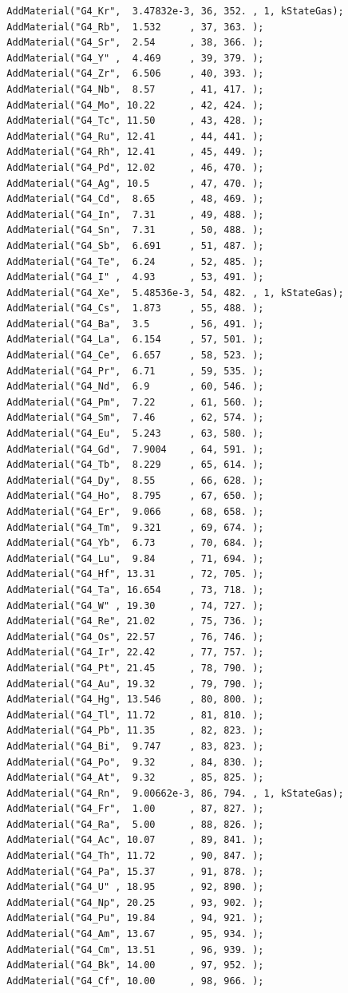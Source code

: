 \documentclass[a4paper,12pt]{article}
\begin{document}
\begin{verbatim}
  AddMaterial("G4_Kr",  3.47832e-3, 36, 352. , 1, kStateGas);
  AddMaterial("G4_Rb",  1.532     , 37, 363. );
  AddMaterial("G4_Sr",  2.54      , 38, 366. );
  AddMaterial("G4_Y" ,  4.469     , 39, 379. );
  AddMaterial("G4_Zr",  6.506     , 40, 393. );
  AddMaterial("G4_Nb",  8.57      , 41, 417. );
  AddMaterial("G4_Mo", 10.22      , 42, 424. );
  AddMaterial("G4_Tc", 11.50      , 43, 428. );
  AddMaterial("G4_Ru", 12.41      , 44, 441. );
  AddMaterial("G4_Rh", 12.41      , 45, 449. );
  AddMaterial("G4_Pd", 12.02      , 46, 470. );
  AddMaterial("G4_Ag", 10.5       , 47, 470. );
  AddMaterial("G4_Cd",  8.65      , 48, 469. );
  AddMaterial("G4_In",  7.31      , 49, 488. );
  AddMaterial("G4_Sn",  7.31      , 50, 488. );
  AddMaterial("G4_Sb",  6.691     , 51, 487. );
  AddMaterial("G4_Te",  6.24      , 52, 485. );
  AddMaterial("G4_I" ,  4.93      , 53, 491. );
  AddMaterial("G4_Xe",  5.48536e-3, 54, 482. , 1, kStateGas);
  AddMaterial("G4_Cs",  1.873     , 55, 488. );
  AddMaterial("G4_Ba",  3.5       , 56, 491. );
  AddMaterial("G4_La",  6.154     , 57, 501. );
  AddMaterial("G4_Ce",  6.657     , 58, 523. );
  AddMaterial("G4_Pr",  6.71      , 59, 535. );
  AddMaterial("G4_Nd",  6.9       , 60, 546. );
  AddMaterial("G4_Pm",  7.22      , 61, 560. );
  AddMaterial("G4_Sm",  7.46      , 62, 574. );
  AddMaterial("G4_Eu",  5.243     , 63, 580. );
  AddMaterial("G4_Gd",  7.9004    , 64, 591. );
  AddMaterial("G4_Tb",  8.229     , 65, 614. );
  AddMaterial("G4_Dy",  8.55      , 66, 628. );
  AddMaterial("G4_Ho",  8.795     , 67, 650. );
  AddMaterial("G4_Er",  9.066     , 68, 658. );
  AddMaterial("G4_Tm",  9.321     , 69, 674. );
  AddMaterial("G4_Yb",  6.73      , 70, 684. );
  AddMaterial("G4_Lu",  9.84      , 71, 694. );
  AddMaterial("G4_Hf", 13.31      , 72, 705. );
  AddMaterial("G4_Ta", 16.654     , 73, 718. );
  AddMaterial("G4_W" , 19.30      , 74, 727. );
  AddMaterial("G4_Re", 21.02      , 75, 736. );
  AddMaterial("G4_Os", 22.57      , 76, 746. );
  AddMaterial("G4_Ir", 22.42      , 77, 757. );
  AddMaterial("G4_Pt", 21.45      , 78, 790. );
  AddMaterial("G4_Au", 19.32      , 79, 790. );
  AddMaterial("G4_Hg", 13.546     , 80, 800. );
  AddMaterial("G4_Tl", 11.72      , 81, 810. );
  AddMaterial("G4_Pb", 11.35      , 82, 823. );
  AddMaterial("G4_Bi",  9.747     , 83, 823. );
  AddMaterial("G4_Po",  9.32      , 84, 830. );
  AddMaterial("G4_At",  9.32      , 85, 825. );
  AddMaterial("G4_Rn",  9.00662e-3, 86, 794. , 1, kStateGas);
  AddMaterial("G4_Fr",  1.00      , 87, 827. );
  AddMaterial("G4_Ra",  5.00      , 88, 826. );
  AddMaterial("G4_Ac", 10.07      , 89, 841. );
  AddMaterial("G4_Th", 11.72      , 90, 847. );
  AddMaterial("G4_Pa", 15.37      , 91, 878. );
  AddMaterial("G4_U" , 18.95      , 92, 890. );
  AddMaterial("G4_Np", 20.25      , 93, 902. );
  AddMaterial("G4_Pu", 19.84      , 94, 921. );
  AddMaterial("G4_Am", 13.67      , 95, 934. );
  AddMaterial("G4_Cm", 13.51      , 96, 939. );
  AddMaterial("G4_Bk", 14.00      , 97, 952. );
  AddMaterial("G4_Cf", 10.00      , 98, 966. );


\end{verbatim}
\end{document}
